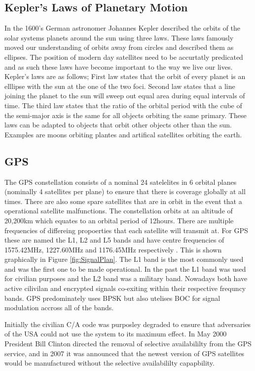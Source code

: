 \subsection{Kepler's Laws of Planetary Motion} \label{subsec: OrbitalMechanics}
In the 1600's German astronomer Johannes Kepler described the orbits of the solar systems planets around the sun using three laws. 
These laws famously moved our understanding of orbits away from circles and described them as ellipses. The position of modern day satellites need to be accurtatly
predicated and as such these laws have become important to the way we live our lives. Kepler's laws are as follows; First law states that the orbit of every planet is an
elllipse with the sun at the one of the two foci. Second law states that a line joining the planet to the sun will sweep out equal area during equal intervals of time.
The third law states that the ratio of the orbital period with the cube of the semi-major axis is the same for all objects orbiting the same primary. These laws can be
adapted to objects that orbit other objects other than the sun. Examples are moons orbiting plantes and artifical satellites orbiting the earth.

\subsection{GPS} \label{subsec:GNSS_GPSIntro}
The GPS constellation consists of a nominal 24 satelelites in 6 orbital planes (nominally 4 satellites per plane) to ensure that there is coverage globally at all times.
There are also some spare satellites that are in orbit in the event that a operational satellite malfunctions.
The constellation orbits at an altitude of 20,200km which equates to an orbital period of 12hours.
There are multiple frequencies of differeing propoerties that each satellite will transmit at. For GPS these are named the L1, L2 and L5 bands and have centre frequencies
of 1575.42MHz, 1227.60MHz and 1176.45MHz respectively \cite{RN49}. This is shown graphically in Figure \ref{fig:SignalPlan}. The L1 band is the most commonly used and was the first one to be made operational. In the past the L1
band was used for civilian purposes and the L2 band was a military band. Nowadays both have active cilivilan and encrypted signals co-exiting within their respective
frequncy bands. GPS predominately uses BPSK but also utelises BOC for signal modulation accross all of the bands.  

Initially the civilian C/A code was purposley degraded to ensure that adversaries of the USA could not use the system to its maximum effect. In May 2000 President Bill
Clinton directed the removal of selective availabililty from the GPS service, and in 2007 it was announced that the newest version of GPS satellites would be manufactured
without the selective availabililty capapbility.

